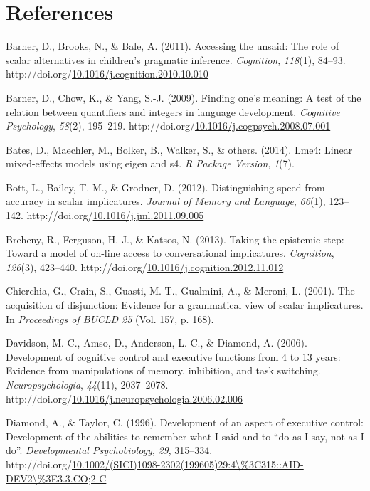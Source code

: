 \documentclass[a4paper,man,apacite,floatsintext]{apa6}
\begin{document}
\newpage

\section*{References}\label{references}

Barner, D., Brooks, N., \& Bale, A. (2011). Accessing the unsaid: The
role of scalar alternatives in children's pragmatic inference.
\emph{Cognition}, \emph{118}(1), 84--93.
http://doi.org/\href{http://dx.doi.org/10.1016/j.cognition.2010.10.010}{10.1016/j.cognition.2010.10.010}

Barner, D., Chow, K., \& Yang, S.-J. (2009). Finding one's meaning: A
test of the relation between quantifiers and integers in language
development. \emph{Cognitive Psychology}, \emph{58}(2), 195--219.
http://doi.org/\href{http://dx.doi.org/10.1016/j.cogpsych.2008.07.001}{10.1016/j.cogpsych.2008.07.001}

Bates, D., Maechler, M., Bolker, B., Walker, S., \& others. (2014).
Lme4: Linear mixed-effects models using eigen and s4. \emph{R Package
Version}, \emph{1}(7).

Bott, L., Bailey, T. M., \& Grodner, D. (2012). Distinguishing speed
from accuracy in scalar implicatures. \emph{Journal of Memory and
Language}, \emph{66}(1), 123--142.
http://doi.org/\href{http://dx.doi.org/10.1016/j.jml.2011.09.005}{10.1016/j.jml.2011.09.005}

Breheny, R., Ferguson, H. J., \& Katsos, N. (2013). Taking the epistemic
step: Toward a model of on-line access to conversational implicatures.
\emph{Cognition}, \emph{126}(3), 423--440.
http://doi.org/\href{http://dx.doi.org/10.1016/j.cognition.2012.11.012}{10.1016/j.cognition.2012.11.012}

Chierchia, G., Crain, S., Guasti, M. T., Gualmini, A., \& Meroni, L.
(2001). The acquisition of disjunction: Evidence for a grammatical view
of scalar implicatures. In \emph{Proceedings of BUCLD 25} (Vol. 157, p.
168).

Davidson, M. C., Amso, D., Anderson, L. C., \& Diamond, A. (2006).
Development of cognitive control and executive functions from 4 to 13
years: Evidence from manipulations of memory, inhibition, and task
switching. \emph{Neuropsychologia}, \emph{44}(11), 2037--2078.
http://doi.org/\href{http://dx.doi.org/10.1016/j.neuropsychologia.2006.02.006}{10.1016/j.neuropsychologia.2006.02.006}

Diamond, A., \& Taylor, C. (1996). Development of an aspect of executive
control: Development of the abilities to remember what I said and to
``do as I say, not as I do''. \emph{Developmental Psychobiology},
\emph{29}, 315--334.
http://doi.org/\href{http://dx.doi.org/10.1002/(SICI)1098-2302(199605)29:4/\%3C315::AID-DEV2/\%3E3.3.CO;2-C}{10.1002/(SICI)1098-2302(199605)29:4\textbackslash{}\%3C315::AID-DEV2\textbackslash{}\%3E3.3.CO;2-C}
\end{document}
